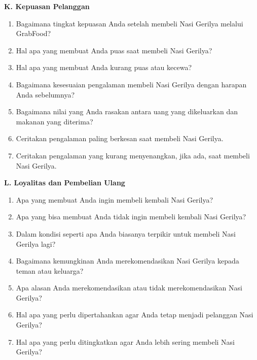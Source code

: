 \documentclass[10pt,a4paper]{article}
\newcommand{\sectionbar}[1]{%
  \Needspace{5\baselineskip}
  \vspace{4mm}
  \noindent\colorbox{Soft}{%
    \parbox{\dimexpr\linewidth-2\fboxsep\relax}{%
      \large\bfseries\textcolor{Primary}{#1}
    }%
  }\par\vspace{1mm}
}
\newcommand{\probe}[1]{%
  \vspace{1mm}
  \noindent{\small\textbf{\textcolor{Accent}{Probing:}} \textcolor{TextGray}{#1}}\par
}
\begin{document}
\sectionbar{K. Kepuasan Pelanggan}
\begin{enumerate}[label=\arabic*.,leftmargin=*,itemsep=1.2mm,resume]
\item Bagaimana tingkat kepuasan Anda setelah membeli Nasi Gerilya melalui GrabFood?
\item Hal apa yang membuat Anda puas saat membeli Nasi Gerilya?
\item Hal apa yang membuat Anda kurang puas atau kecewa?
\item Bagaimana kesesuaian pengalaman membeli Nasi Gerilya dengan harapan Anda sebelumnya?
\item Bagaimana nilai yang Anda rasakan antara uang yang dikeluarkan dan makanan yang diterima?
\item Ceritakan pengalaman paling berkesan saat membeli Nasi Gerilya.
\item Ceritakan pengalaman yang kurang menyenangkan, jika ada, saat membeli Nasi Gerilya.
\end{enumerate}
\probe{Tanyakan contoh pengalaman spesifik agar jawaban tidak terlalu umum.}

\sectionbar{L. Loyalitas dan Pembelian Ulang}
\begin{enumerate}[label=\arabic*.,leftmargin=*,itemsep=1.2mm,resume]
\item Apa yang membuat Anda ingin membeli kembali Nasi Gerilya?
\item Apa yang bisa membuat Anda tidak ingin membeli kembali Nasi Gerilya?
\item Dalam kondisi seperti apa Anda biasanya terpikir untuk membeli Nasi Gerilya lagi?
\item Bagaimana kemungkinan Anda merekomendasikan Nasi Gerilya kepada teman atau keluarga?
\item Apa alasan Anda merekomendasikan atau tidak merekomendasikan Nasi Gerilya?
\item Hal apa yang perlu dipertahankan agar Anda tetap menjadi pelanggan Nasi Gerilya?
\item Hal apa yang perlu ditingkatkan agar Anda lebih sering membeli Nasi Gerilya?
\end{enumerate}
\probe{Gali syarat pembelian ulang, penyebab pindah ke pesaing, dan kemungkinan rekomendasi.}
\end{document}
